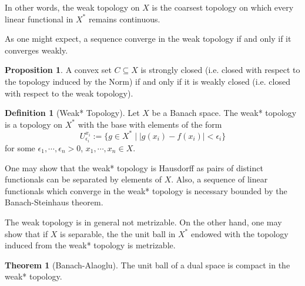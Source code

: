 \documentclass[]{article}
\theoremstyle{definition}
\newtheorem{theorem}{Theorem}
\theoremstyle{definition}
\newtheorem{definition}{Definition}[section]
\newtheorem{proposition}{Proposition}[section]
\begin{document}
In other words, the weak topology on \(X\) is the coarsest topology on which 
every linear functional in \(X^*\) remains continuous. 

As one might expect, a sequence converge in the weak topology if and only if 
it converges weakly.

\begin{proposition}
  A convex set \(C \subseteq X\) is strongly closed (i.e. closed with respect 
  to the topology induced by the Norm) if and only if it is weakly closed 
  (i.e. closed with respect to the weak topology).
\end{proposition}

\begin{definition}[Weak* Topology]
  Let \(X\) be a Banach space. The weak* topology is a topology on \(X^*\) 
  with the base with elements of the form 
  \[U_{\epsilon_i}^{x_i} := \{g \in X^* \mid |g(x_i) - f(x_i)| < \epsilon_i\}\]
  for some \(\epsilon_1, \cdots, \epsilon_n > 0\), \(x_1, \cdots, x_n \in X\).
\end{definition}

One may show that the weak* topology is Hausdorff as pairs of distinct 
functionals can be separated by elements of \(X\). Also, a sequence of 
linear functionals which converge in the weak* topology is necessary bounded 
by the Banach-Steinhaus theorem.

The weak topology is in general not metrizable. On the other hand, one 
may show that if \(X\) is separable, the the unit ball in \(X^*\) endowed 
with the topology induced from the weak* topology is metrizable.

\begin{theorem}[Banach-Alaoglu]
  The unit ball of a dual space is compact in the weak* topology.
\end{theorem}
\end{document}
